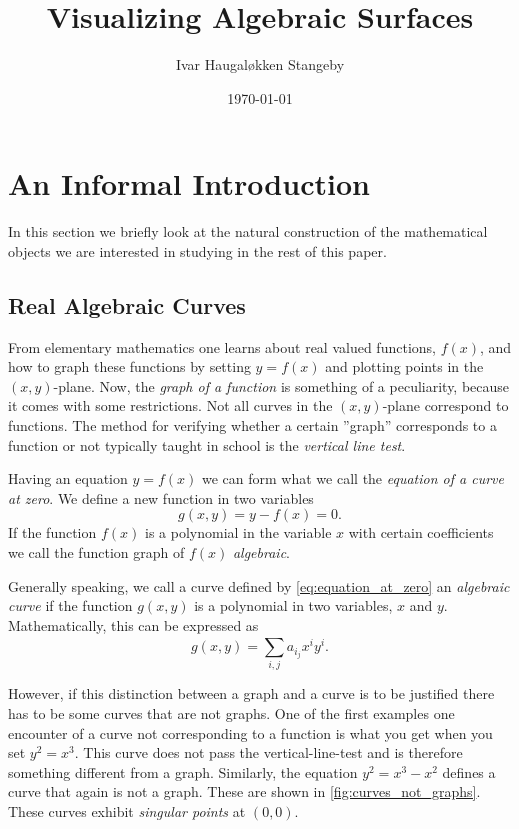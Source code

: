 \documentclass[a4paper]{article}
\title{Visualizing Algebraic Surfaces}
\author{Ivar Haugal{\o}kken Stangeby}
\date{\today}
\begin{document}
    
    \maketitle
    \tableofcontents

    \section{An Informal Introduction}
    \label{sec:an_informal_introduction}
    
    In this section we briefly look at the natural construction of the
    mathematical objects we are interested in studying in the rest of this
    paper.

    \subsection{Real Algebraic Curves}
    \label{sub:real_algebraic_curves}
    
    From elementary mathematics one learns about real valued functions, $f(x)$,
    and how to graph these functions by setting $y = f(x)$ and plotting points
    in the $(x, y)$-plane. Now, the \emph{graph of a function} is something of
    a peculiarity, because it comes with some restrictions. Not all curves in
    the $(x, y)$-plane correspond to functions. The method for verifying
    whether a certain ''graph'' corresponds to a function or not typically
    taught in school is the \emph{vertical line test}. 

    Having an equation $y = f(x)$ we can form what we call the \emph{equation
    of a curve at zero}. We define a new function in two variables
    \begin{equation}
        \label{eq:equation_at_zero}
        g(x, y) = y - f(x) = 0.
    \end{equation}
    If the function $f(x)$ is a polynomial in the variable $x$ with certain
    coefficients we call the function graph of $f(x)$ \emph{algebraic}.

    Generally speaking, we call a curve defined by \cref{eq:equation_at_zero}
    an \emph{algebraic curve} if the function $g(x, y)$ is a polynomial in two
    variables, $x$ and $y$. Mathematically, this can be expressed as
    \begin{equation}
        \label{eq:algebraic_curve}
        g(x, y) = \sum^{}_{i, j} a_{i_j}x^{i}y^{i}.
    \end{equation}
    
    However, if this distinction between a graph and a curve is to be justified
    there has to be some curves that are not graphs. One of the first examples
    one encounter of a curve not corresponding to a function is what you get
    when you set $y^2 = x^3$. This curve does not pass the vertical-line-test
    and is therefore something different from a graph. Similarly, the equation
    $y^2 = x^3 - x^2$ defines a curve that again is not a graph. These are
    shown in \cref{fig:curves_not_graphs}. These curves exhibit \emph{singular
    points} at $(0, 0)$. 
    
\end{document}
